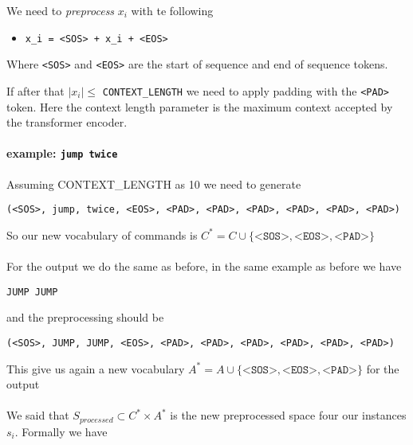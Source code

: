 \documentclass[]{article}
\begin{document}
We need to \textit{preprocess} $x_i$ with te following

\begin{itemize}
    \item \texttt{x\_i = <SOS> + x\_i + <EOS>}
\end{itemize}
Where \texttt{<SOS>} and \texttt{<EOS>} are the start of sequence and end of sequence tokens.

If after that $|x_i| \leq $ \texttt{CONTEXT\_LENGTH} we need to apply padding with the \texttt{<PAD>} token. Here the context length parameter is the maximum context accepted by the transformer encoder.

\paragraph*{example: \texttt{jump twice}}

Assuming CONTEXT\_LENGTH as 10 we need to generate

\begin{center}
    \texttt{(<SOS>, jump, twice, <EOS>, <PAD>, <PAD>, <PAD>, <PAD>, <PAD>, <PAD>)}
\end{center}

So our new vocabulary of commands is $C^* = C \cup \{\texttt{<SOS>}, \texttt{<EOS>}, \texttt{<PAD>}\}$

\paragraph*{}
For the output we do the same as before, in the same example as before we have

\begin{center}
    \texttt{JUMP JUMP}
\end{center}

and the preprocessing should be

\begin{center}
    \texttt{(<SOS>, JUMP, JUMP, <EOS>, <PAD>, <PAD>, <PAD>, <PAD>, <PAD>, <PAD>)}
\end{center}

This give us again a new vocabulary $A^* = A \cup \{\texttt{<SOS>}, \texttt{<EOS>}, \texttt{<PAD>}\}$ for the output

\paragraph*{}
We said that $S_{processed} \subset C^* \times A^*$ is the new preprocessed space four our instances $s_i$. Formally we have
\end{document}
